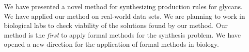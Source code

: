 % 
We have presented a novel method for synthesizing production rules for glycans.
We have applied our method on  real-world data sets. %
We are planning to work in biological labs to check viability of the solutions
found by our method.
Our method is the {\em first} to apply formal methods for the synthesis problem.
We have opened a new direction for the application of formal methods in biology.





